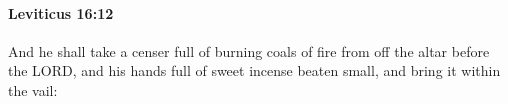 
		\paragraph{Leviticus 16:12} %
			\label{LEVITICUS-16-12}

			And he shall take a censer full of burning coals of fire from off the altar before the LORD, and his hands full of sweet incense beaten small, and bring it within the vail:


